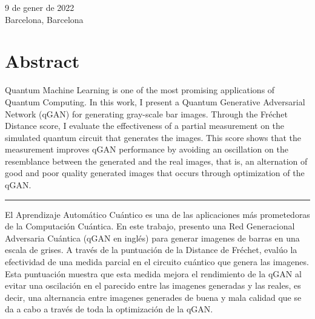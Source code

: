 \documentclass[a4paper,12pt,arial,numbered,print,oneside]{book}
\newcommand\blankpage{%
	\null
	\thispagestyle{empty}%
	\addtocounter{page}{-1}%
	\newpage}
\begin{document}
\begin{titlepage}
\begin{center}
\begin{singlespace}
		\vspace{.3cm}
		
		
		{\large 9 de gener de 2022} \\
		\large Barcelona, Barcelona  
		
		
		\vfill %
		\end{singlespace}
		\end{center}
		
	\end{titlepage}

	\afterpage{\blankpage}

	\tableofcontents
	
	\afterpage{\blankpage}
	
	\section*{Abstract}
	\tab Quantum Machine Learning is one of the most promising applications of Quantum Computing. In this work, I present a Quantum Generative Adversarial Network (qGAN) for generating gray-scale bar images. Through the Fréchet Distance score, I evaluate the effectiveness of a partial measurement on the simulated quantum circuit that generates the images. This score shows that the measurement improves qGAN performance by avoiding an oscillation on the resemblance between the generated and the real images, that is, an alternation of good and poor quality generated images that occurs through optimization of the qGAN. 
	
	\vspace{1cm}
	\hrule
	\vspace{1cm}

	El Aprendizaje Automático Cuántico es una de las aplicaciones más prometedoras de la Computación Cuántica. En este trabajo, presento una Red Generacional Adversaria Cuántica (qGAN en inglés) para generar imagenes de barras en una escala de grises. A través de la puntuación de la Distance de Fréchet, evalúo la efectividad de una medida parcial en el circuito cuántico que genera las imagenes. Esta puntuación muestra que esta medida mejora el rendimiento de la qGAN al evitar una oscilación en el parecido entre las imagenes generadas y las reales, es decir, una alternancia entre imagenes generades de buena y mala calidad que se da a cabo a través de toda la optimización de la qGAN.
	
\end{document}

